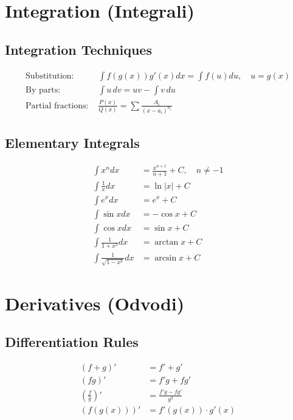 \documentclass[10pt,twocolumn,a4paper]{article}
\begin{document}
\section{Integration (Integrali)}

\subsection{Integration Techniques}
\begin{align}
\text{Substitution: } &\int f(g(x))g'(x) dx = \int f(u) du, \quad u = g(x)\\
\text{By parts: } &\int u \, dv = uv - \int v \, du\\
\text{Partial fractions: } &\frac{P(x)}{Q(x)} = \sum \frac{A_i}{(x-a_i)^{n_i}}
\end{align}

\subsection{Elementary Integrals}
\begin{align}
\int x^n dx &= \frac{x^{n+1}}{n+1} + C, \quad n \neq -1\\
\int \frac{1}{x} dx &= \ln|x| + C\\
\int e^x dx &= e^x + C\\
\int \sin x dx &= -\cos x + C\\
\int \cos x dx &= \sin x + C\\
\int \frac{1}{1+x^2} dx &= \arctan x + C\\
\int \frac{1}{\sqrt{1-x^2}} dx &= \arcsin x + C
\end{align}

\section{Derivatives (Odvodi)}

\subsection{Differentiation Rules}
\begin{align}
(f + g)' &= f' + g'\\
(fg)' &= f'g + fg'\\
\left(\frac{f}{g}\right)' &= \frac{f'g - fg'}{g^2}\\
(f(g(x)))' &= f'(g(x)) \cdot g'(x)
\end{align}
\end{document}
